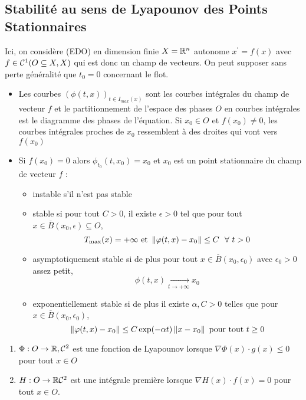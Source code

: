 \documentclass{cours}
\begin{document}
\subsection{Stabilité au sens de Lyapounov des Points Stationnaires}
Ici, on considère (EDO) en dimension finie $X = \mathbb{R}^{n}$ autonome $x^{'} = f(x)$ avec $f \in \mathcal{C}^{1}(O\subseteq X, X)$ qui est donc un champ de vecteurs. On peut supposer sans perte généralité que $t_{0} = 0$ concernant le flot. 
\begin{definition}
    \begin{itemize}
        \item Les courbes $(\phi(t,x))_{t \in I_{max}(x)}$ sont les courbes intégrales du champ de vecteur $f$ et le partitionnement de l'espace des phases $O$ en courbes intégrales est le diagramme des phases de l'équation. Si $x_{0} \in O$ et $f(x_{0}) \neq 0$, les courbes intégrales proches de $x_{0}$ ressemblent à des droites qui vont vers $f(x_{0})$
        \item Si $f(x_{0}) = 0$ alors $\phi_{t_{0}}(t, x_{0}) = x_{0}$ et $x_{0}$ est un point stationnaire du champ de vecteur $f$ : 
        \begin{itemize}
            \item instable s'il n'est pas stable
            \item stable si pour tout $C > 0$, il existe $\epsilon > 0$ tel que pour tout $x \in \overline{B}(x_{0}, \epsilon) \subseteq O$,
            \[
                T_{\max }(x) = + \infty \text{ et } \left\lVert \varphi(t, x) - x_{0} \right\rVert \leq C\ \ \forall \ t > 0
            \]
            \item asymptotiquement stable si de plus pour tout $x \in \overline{B}(x_{0}, \epsilon_{0})$ avec $\epsilon_{0} > 0$ assez petit,
            \[
                \phi(t, x) \xrightarrow[t \to + \infty]{} x_{0} 
            \]
            \item exponentiellement stable si de plus il existe $\alpha, C >0$ telles que pour $x \in \overline{B}(x_{0}, \epsilon_{0})$,
            \[
                \left\lVert \varphi(t, x) - x_{0} \right\rVert \leq C\exp(-\alpha t) \left\lVert x - x_{0} \right\rVert \text{ pour tout } t \geq 0
            \]
        \end{itemize}
    \end{itemize}
\end{definition}

\begin{definition}
    \begin{enumerate}
        \item $\Phi : O \to \mathbb{R}, \mathcal{C}^{2}$ est une fonction de Lyapounov lorsque $\nabla \Phi(x) \cdot g(x) \leq 0$ pour tout $x \in O$
        \item $H : O \to \mathbb{R} \mathcal{C}^{2}$ est une intégrale première lorsque $\nabla H(x) \cdot f(x) = 0$ pour tout $x\in O$. 
    \end{enumerate}
\end{definition}
\end{document}
